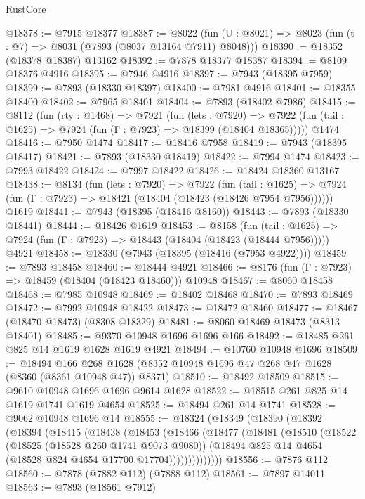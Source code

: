 \begin{lexlean}{RustCore}
\begin{coremodule}
@18378 := @7915 @18377
@18387 := @8022
    (fun (U : @8021) => @8023 (fun (t : @7) => @8031 (@7893 (@8037 @13164 @7911) @8048)))
@18390 := @18352 (@18378 @18387) @13162
@18392 := @7878 @18377 @18387
@18394 := @8109 @18376 @4916
@18395 := @7946 @4916
@18397 := @7943 (@18395 @7959)
@18399 := @7893 (@18330 @18397)
@18400 := @7981 @4916
@18401 := @18355 @18400
@18402 := @7965 @18401
@18404 := @7893 (@18402 @7986)
@18415 := @8112
    (fun (rty : @1468) =>
    @7921
      (fun (lets : @7920) =>
      @7922 (fun (tail : @1625) => @7924 (fun (Γ : @7923) => @18399 (@18404 @18365)))))
    @1474
@18416 := @7950 @1474
@18417 := @18416 @7958
@18419 := @7943 (@18395 @18417)
@18421 := @7893 (@18330 @18419)
@18422 := @7994 @1474
@18423 := @7993 @18422
@18424 := @7997 @18422
@18426 := @18424 @18360 @13167
@18438 := @8134
    (fun (lets : @7920) =>
    @7922
      (fun (tail : @1625) =>
      @7924 (fun (Γ : @7923) => @18421 (@18404 (@18423 (@18426 @7954 @7956))))))
    @1619
@18441 := @7943 (@18395 (@18416 @8160))
@18443 := @7893 (@18330 @18441)
@18444 := @18426 @1619
@18453 := @8158
    (fun (tail : @1625) => @7924 (fun (Γ : @7923) => @18443 (@18404 (@18423 (@18444 @7956)))))
    @4921
@18458 := @18330 (@7943 (@18395 (@18416 (@7953 @4922))))
@18459 := @7893 @18458
@18460 := @18444 @4921
@18466 := @8176 (fun (Γ : @7923) => @18459 (@18404 (@18423 @18460))) @10948
@18467 := @8060 @18458
@18468 := @7985 @10948
@18469 := @18402 @18468
@18470 := @7893 @18469
@18472 := @7992 @10948 @18422
@18473 := @18472 @18460
@18477 := @18467 (@18470 @18473) (@8308 @18329)
@18481 := @8060 @18469 @18473 (@8313 @18401)
@18485 := @9370 @10948 @1696 @1696 @166
@18492 := @18485 @261 @825 @14 @1619 @1628 @1619 @4921
@18494 := @10760 @10948 @1696
@18509 := @18494
    @166
    @268
    @1628
    (@8352 @10948 @1696 @47 @268 @47 @1628 (@8360 (@8361 @10948 @47)) @8371)
@18510 := @18492 @18509
@18515 := @9610 @10948 @1696 @1696 @9614 @1628
@18522 := @18515 @261 @825 @14 @1619 @1741 @1619 @4654
@18525 := @18494 @261 @14 @1741
@18528 := @9062 @10948 @1696 @14
@18555 := @18324
    (@18349
      (@18390
        (@18392
          (@18394
            (@18415
              (@18438
                (@18453
                  (@18466
                    (@18477
                      (@18481
                        (@18510
                          (@18522
                            (@18525 (@18528 @260 @1741 @9073 @9080))
                            (@18494 @825 @14 @4654 (@18528 @824 @4654 @17700 @17704))))))))))))))
@18556 := @7876 @112
@18560 := @7878 (@7882 @112) (@7888 @112)
@18561 := @7897 @14011
@18563 := @7893 (@18561 @7912)

\end{coremodule}
\end{lexlean}
